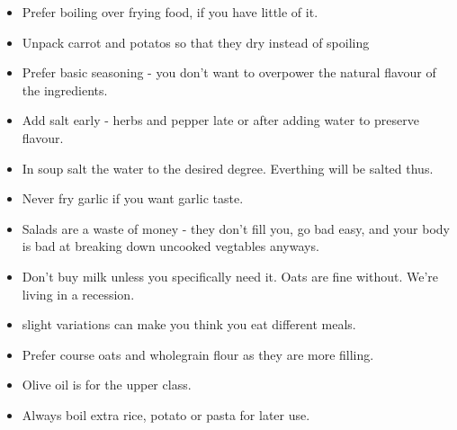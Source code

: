   \begin{itemize}
    \item Prefer boiling over frying food, if you have little of it.
    \item Unpack carrot and potatos so that they dry instead of spoiling
    \item Prefer basic seasoning - you don't want to overpower the
      natural flavour
      of the ingredients.
    \item Add salt early - herbs and pepper late or after adding
      water to preserve flavour.
    \item In soup salt the water to the desired degree. Everthing will be salted
      thus.
    \item Never fry garlic if you want garlic taste.
    \item Salads are a waste of money - they don't fill you, go bad easy, and
      your body is bad at breaking down uncooked vegtables anyways.
    \item Don't buy milk unless you specifically need it. Oats
      are fine without. We're living in a recession.
    \item slight variations can make you think you eat different meals.
    \item Prefer course oats and wholegrain flour as they are more filling.
    \item Olive oil is for the upper class.
    \item Always boil extra rice, potato or pasta for later use.
  \end{itemize}

  \clearpage
